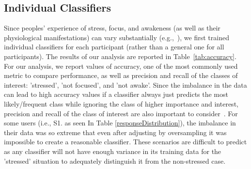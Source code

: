 \subsection{Individual Classifiers}
Since peoples' experience of stress, focus, and awakeness (as well as
their physiological manifestations) can vary substantially
(e.g.,~\cite{Hernandez11}), we first trained individual classifiers
for each participant (rather than a general one for all
participants). The results of our analysis are reported in
Table~\ref{tab:accuracy}. For our analysis, we report values of
accuracy, one of the most commonly used metric to compare performance,
as well as precision and recall of the classes of interest:
'stressed', 'not focused', and 'not awake'. Since the imbalance in the
data can lead to high accuracy values if a classifier always just
predicts the most likely/frequent class while ignoring the class of
higher importance and interest, precision and recall of the class of
interest are also important to
consider~\cite{yap2014,bhattacharyya_data_2011,Hernandez11}.
For some users (i.e., S1. as seen In Table \ref{responseDistribution}), the imbalance in their data was so extreme that even after adjusting by oversampling it was impossible to create a reasonable classifier. These scenarios are difficult to predict as any classifier will not have enough variance in its training data for the 'stressed' situation to adequately distinguish it from the non-stressed case.




